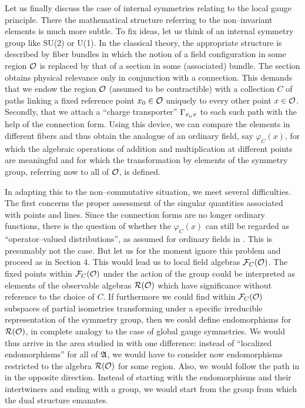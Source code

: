 Let us finally discuss the case of internal symmetries relating  
to the local gauge principle. There the mathematical structure 
referring to the non--invariant elements is much  
more subtle. To fix ideas, let us think of an internal symmetry
group like SU(2) or U(1). In the classical theory, the appropriate
structure is described by fiber bundles in which the notion of a field
configuration in some region ${\cal O}$ is replaced by that of a 
section in some (associated) bundle. The section obtains
physical relevance only in conjunction with a connection. This
demands that we endow the region ${\cal O}$ (assumed to
be contractible) with a collection $C$ of paths linking a fixed 
reference point $x_0 \in {\cal O}$ uniquely 
to every other point $x \in {\cal O}$.
Secondly, that we attach a ``charge transporter''  
$\Gamma_{{x}^{}_{0} \hspace*{0.7pt} x}$ 
to each such path with the help of the connection form.
Using this device, we can compare the elements in different 
fibers and thus 
obtain the analogue of an ordinary field, say
$\varphi_C (x)$, for which the algebraic operations of addition and
multiplication at different points are
meaningful and for which the transformation by elements of the
symmetry group, referring now to all of ${\cal O}$, is defined.

In adapting this to the non--commutative situation, we meet several 
difficulties. The first concerns the proper assessment of the singular
quantities associated with points and lines. Since the connection forms 
are no longer ordinary functions, there is the question of
whether the  $\varphi_C (x)$ can still be regarded as ``operator--valued
distributions'', as assumed for ordinary fields in \sectwo. This is
presumably not the case. 
But let us for the moment ignore this problem and proceed as in
Section 4. This would lead us to local field algebras 
${\cal F}_C ({\cal  O})$. The fixed points within ${\cal F}_C ({\cal O})$ 
under the action of the group 
could be interpreted as elements of the observable algebras  
${\cal R} ({\cal O})$ which have significance without reference to
the choice of $C$. If furthermore we could find within 
${\cal F}_C ({\cal O}) $ subspaces of partial isometries 
transforming under a specific irreducible representation 
of the symmetry group, then we could define endomorphisms for ${\cal R}({\cal O})$,
in complete analogy to the case of global gauge symmetries.
We would thus arrive in the area 
studied in \cite{DoRo} with one difference: instead of
``localized endomorphisms'' for all of ${\mathfrak A}$, we would have to
consider now endomorphisms restricted to the algebra 
${\cal R}({\cal O})$ for
some region. Also, we would follow the path in \cite{DoRo} in the
opposite direction. Instead of starting with the endomorphisms and
their intertwiners and ending with a group, we would start from the
group from which the dual structure emanates.

